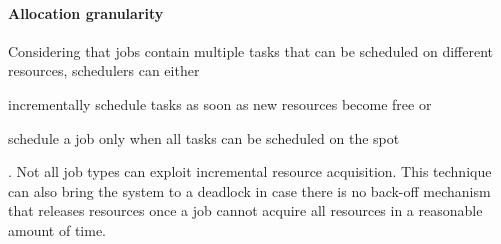 \paragraph{Allocation granularity}
Considering that jobs contain multiple tasks that can be scheduled on different resources, schedulers can either
\begin{mylist}
    \item incrementally schedule tasks as soon as new resources become free or
    \item schedule a job only when all tasks can be scheduled on the spot
\end{mylist}.
Not all job types can exploit incremental resource acquisition.
This technique can also bring the system to a deadlock in case there is no back-off mechanism that releases resources once a job cannot acquire all resources in a reasonable amount of time.